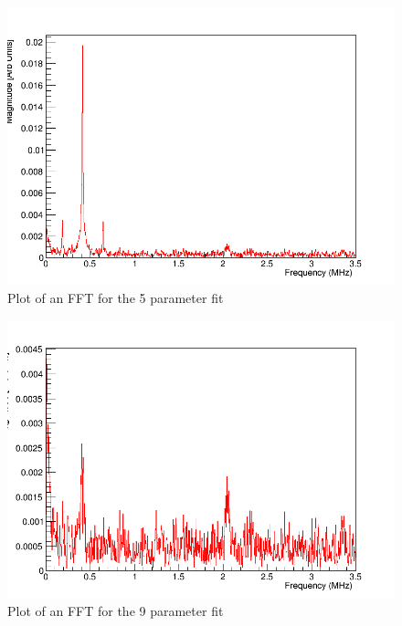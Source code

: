 \begin{figure}[ht]
\centering 
\includegraphics[scale=0.5]{Figures/5par_fft.png}
\decoRule
\caption{Plot of an FFT for the 5 parameter fit}
\label{fig:5par_fft}
\end{figure}

\iffalse
\begin{figure}[ht]
\centering 
\includegraphics[scale=0.5]{Figures/9par_fft.png}
\decoRule
\caption{Plot of an FFT for the 9 parameter fit}
\label{fig:9par_fft}
\end{figure}

